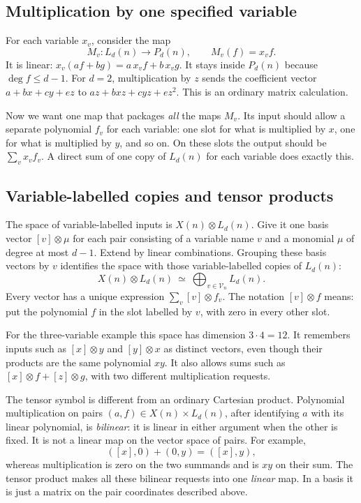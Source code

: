 \documentclass[11pt,a4paper,oneside,openany]{book}
\theoremstyle{definition}\newtheorem{definition}[theorem]{Definition}
\theoremstyle{remark}\newtheorem{remark}[theorem]{Remark}
\numberwithin{equation}{chapter}
\begin{document}
\subsection{Multiplication by one specified variable}
For each variable $x_v$, consider the map
\[
     M_v:L_d(n)\to P_d(n),\qquad M_v(f)=x_vf.
\]
It is linear: $x_v(af+bg)=a\,x_vf+b\,x_vg$.
It stays inside $P_d(n)$ because $\deg f\le d-1$.
For $d=2$, multiplication by $z$ sends the coefficient vector
$a+bx+cy+ez$ to $az+bxz+cyz+ez^2$.
This is an ordinary matrix calculation.

Now we want one map that packages \emph{all} the maps $M_v$.
Its input should allow a separate polynomial $f_v$ for each variable:
one slot for what is multiplied by $x$, one for what is multiplied by
$y$, and so on. On these slots the output should be
$\sum_v x_vf_v$. A direct sum of one copy of $L_d(n)$ for each
variable does exactly this.

\subsection{Variable-labelled copies and tensor products}\label{tx:sec:tensor-registers}
The space of variable-labelled inputs is $X(n)\otimes L_d(n)$.
Give it one basis vector
$[v]\otimes\mu$ for each pair consisting of a variable name $v$
and a monomial $\mu$ of degree at most $d-1$.
Extend by linear combinations. Grouping these basis vectors by $v$
identifies the space with those variable-labelled copies of $L_d(n)$:
\[
       X(n)\otimes L_d(n)\ \simeq\
                     \bigoplus_{v\in\mathcal V_n}L_d(n).
\]
Every vector has a unique expression $\sum_v[v]\otimes f_v$.
The notation $[v]\otimes f$ means: put the polynomial $f$ in the
slot labelled by $v$, with zero in every other slot.

For the three-variable example this space has dimension $3\cdot4=12$.
It remembers inputs such as $[x]\otimes y$ and $[y]\otimes x$
as distinct vectors, even though their products are the same
polynomial $xy$. It also allows sums such as
$[x]\otimes f+[z]\otimes g$, with two different multiplication requests.

The tensor symbol is different from an ordinary Cartesian product.
Polynomial multiplication on pairs
$(a,f)\in X(n)\times L_d(n)$, after identifying $a$ with its
linear polynomial, is \emph{bilinear}: it is linear in either
argument when the other is fixed. It is not a linear map on the
vector space of pairs. For example,
\[
 ( [x],0)+(0,y)=([x],y),
\]
whereas multiplication is zero on the two summands and is $xy$
on their sum. The tensor product makes all these bilinear requests
into one \emph{linear} map. In a basis it is just a matrix on the
pair coordinates described above.
\end{document}
